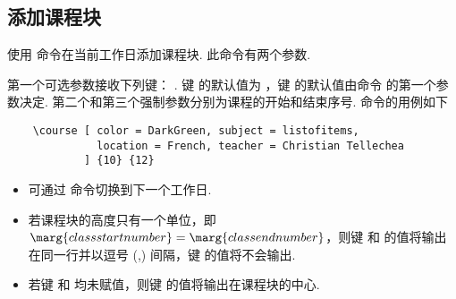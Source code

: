 \documentclass[letterpaper]{l3doc}
\newenvironment{example}{\begin{list}{}{\leftmargin=3em}\item }{\end{list}}
\begin{document}
\subsection{添加课程块}

使用  命令在当前工作日添加课程块. 此命令有两个参数.

\begin{example}
\end{example}

第一个可选参数接收下列键：    . 键  的默认值为 ，键  的默认值由命令  的第一个参数决定. 第二个和第三个强制参数分别为课程的开始和结束序号.  命令的用例如下

\begin{Verbatim}
    \course [ color = DarkGreen, subject = listofitems, 
              location = French, teacher = Christian Tellechea
            ] {10} {12}
\end{Verbatim}

\begin{center}
    \noindent{}
\end{center}

\begin{itemize}
    \item 可通过  命令切换到下一个工作日.
    \item 若课程块的高度只有一个单位，即$\marg{class start number} = \marg{class end number}$，则键  和  的值将输出在同一行并以逗号 (,) 间隔，键  的值将不会输出.
    \item 若键  和  均未赋值，则键  的值将输出在课程块的中心.
\end{itemize}


\end{document}
